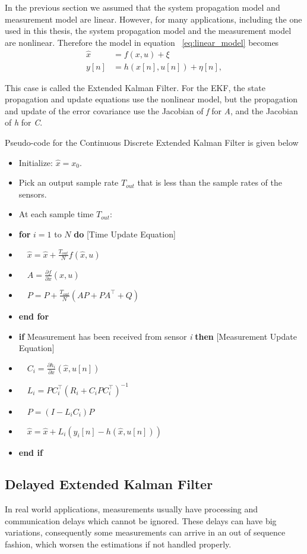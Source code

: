 In the previous section we assumed that the system propagation model and measurement model are linear. However, for many applications, including the one used in this thesis, the system propagation model and the measurement model are nonlinear. Therefore the model in equation ~\ref{eq:linear_model} becomes
\begin{align}
\hat{x}&=f(x,u)+\xi \\
y[n]&=h(x[n],u[n])+\eta[n],
\end{align}

This case is called the Extended Kalman Filter. For the EKF, the state propagation and update equations use the nonlinear model, but the propagation and update of the error covariance use the Jacobian of \textit{f} for \textit{A}, and the Jacobian of \textit{h} for \textit{C}.

Pseudo-code for the Continuous Discrete Extended Kalman Filter is given below
\renewcommand{\labelitemi}{$\cdot$}
\begin{itemize}[nosep]
\item Initialize: $ \hat{x}=x_0 $.
\item Pick an output sample rate $T_{out}$ that is less than the sample rates of the sensors.
\item At each sample time $T_{out}$:

\item \textbf{for} $ i=1 $ to $ N $ \textbf{do} [Time Update Equation]
\item $ \quad \hat{x} = \hat{x} + \frac{T_{out}}{N}f(\hat{x},u) $
\item $ \quad A = \frac{\partial f}{\partial x}(\hat{x},u)$
\item $ \quad P=P+\frac{T_{out}}{N}(AP+PA^\top+Q) $
\item \textbf{end for}
\item \textbf{if} Measurement has been received from sensor \textit{i} \textbf{then} [Measurement Update Equation]
\item $ \quad C_i=\frac{\partial h_i}{\partial x}(\hat{x},u[n])$
\item $ \quad L_i=PC_i^\top(R_i+C_i P C_i^\top)^{-1}$
\item $ \quad P=(I-L_iC_i)P$
\item $ \quad \hat{x}=\hat{x}+L_i(y_i[n]-h(\hat{x},u[n]))$
\item \textbf{end if}
\end{itemize}

\subsection{Delayed Extended Kalman Filter}{\label{sub:DEKF}}
In real world applications, measurements usually have processing and communication delays which cannot be ignored. These delays can have big variations, consequently some measurements can arrive in an out of sequence fashion, which worsen the estimations if not handled properly.

